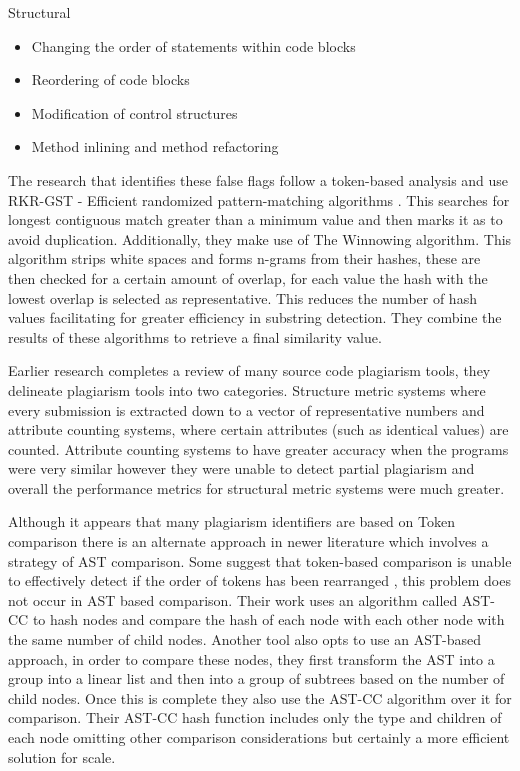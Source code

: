\documentclass[jou,apacite]{apa6}
\begin{document}
Structural
\begin{itemize}
  \setlength\itemsep{-0.5em}
  \item Changing the order of statements within code blocks
  \item Reordering of code blocks
  \item Modification of control structures
  \item Method inlining and method refactoring
\end{itemize}

The research that identifies these false flags follow a token-based analysis and use RKR-GST - Efficient randomized pattern-matching algorithms \cite{Rabin1987}. This searches for longest contiguous match greater than a minimum value and then marks it as to avoid duplication. Additionally, they make use of The Winnowing algorithm. 
This algorithm strips white spaces and forms n-grams from their hashes, these are then checked for a certain amount of overlap, for each value the hash with the lowest overlap is selected as representative. This reduces the number of hash values facilitating for greater efficiency in substring detection. They combine the results of these algorithms to retrieve a final similarity value.

Earlier research \cite{Lancaster2005} completes a review of many source code plagiarism tools, they delineate plagiarism tools into two categories. Structure metric systems where every submission is extracted down to a vector of representative numbers and attribute counting systems, where certain attributes (such as identical values) are counted. Attribute counting systems to have greater accuracy when the programs were very similar however they were unable to detect partial plagiarism and overall the performance metrics for structural metric systems were much greater. 

Although it appears that many plagiarism identifiers are based on Token comparison there is an alternate approach in newer literature which involves a strategy of AST comparison. Some suggest that token-based comparison is unable to effectively detect if the order of tokens has been rearranged \cite{Feng2013}, this problem does not occur in AST based comparison. Their work uses an algorithm called AST-CC to hash nodes and compare the hash of each node with each other node with the same number of child nodes. Another tool \cite{Zhao2015} also opts to use an AST-based approach, in order to compare these nodes, they first transform the AST into a group into a linear list and then into a group of subtrees based on the number of child nodes. Once this is complete they also use the AST-CC algorithm over it for comparison. Their AST-CC hash function includes only the type and children of each node omitting other comparison considerations but certainly a more efficient solution for scale.
\end{document}
